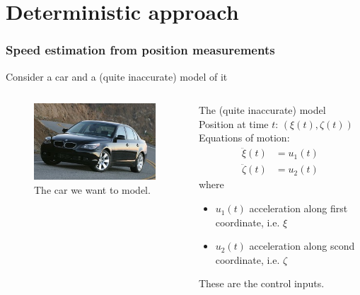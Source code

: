 \section{Deterministic approach}
\begin{frame} 
	\frametitle{Speed estimation from position measurements} 
	Consider a car and a (quite inaccurate) model of it
	\begin{columns}[onlytextwidth]
		\begin{figure}[h]
			\includegraphics[width=\textwidth]{fig/auto_real}%
			\caption*{The car we want to model.\footnotemark} 
		\end{figure}
		\begin{block}{The (quite inaccurate) model}
		Position at time $t$: $(\xi(t), \zeta(t))$ \\%
		Equations of motion:
		\begin{align*}
		  \ddot{\xi}(t)& = u_1(t) \\
		  \ddot{\zeta}(t)& = u_2(t)
		\end{align*}
		where 
		\begin{itemize}
			\item $u_1(t)$ acceleration along first coordinate, i.e. $\xi$\\
			\item $u_2(t)$ acceleration along scond coordinate, i.e. $\zeta$ 
		\end{itemize}
		These are the control inputs.
		\end{block}
	\end{columns}
	
	
\end{frame}

